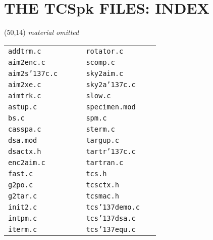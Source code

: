 \documentclass[12pt,fleqn,twoside]{article}
\renewcommand{\_}{{\tt\char'137}}     %
\newcommand{\abridged}  {\vspace{3ex} \begin{center}
                        \framebox(50,14){\vspace*{1mm}
                        \large \it material omitted}
                        \end{center}\vspace{3ex}}
\begin{document}
\ifx\vdoc\vfull
\vfill
\newpage
\fi
\section{THE TCSpk FILES: INDEX}

\ifx\vdoc\vshort
\abridged
\else

\vfill
\begin{center}
\begin{tabular}{lrclr}
{\tt addtrm.c    } & \pageref{tcsAddtrm}  & & {\tt rotator.c   } & \pageref{tcsRotator}  \\
{\tt aim2enc.c   } & \pageref{tcsAim2enc} & & {\tt scomp.c     } & \pageref{tptScomp}    \\
{\tt aim2s\_c.c  } & \pageref{tcsAim2s_c} & & {\tt sky2aim.c   } & \pageref{tcsSky2aim}  \\
{\tt aim2xe.c    } & \pageref{tcsAim2xe}  & & {\tt sky2a\_c.c  } & \pageref{tcsSky2a_c}  \\
{\tt aimtrk.c    } & \pageref{tcsAimtrk}  & & {\tt slow.c      } & \pageref{tcsSlow}     \\
{\tt astup.c     } & \pageref{tcsAstup}   & & {\tt specimen.mod} & \pageref{specimendotmod} \\
{\tt bs.c        } & \pageref{tcsBs}      & & {\tt spm.c       } & \pageref{tcsSpm}      \\
{\tt casspa.c    } & \pageref{tcsCasspa}  & & {\tt sterm.c     } & \pageref{tcsSterm}    \\
{\tt dsa.mod     } & \pageref{dsadotmod}  & & {\tt targup.c    } & \pageref{tcsTargup}   \\
{\tt dsactx.h    } & \pageref{dsactxdoth} & & {\tt tartr\_c.c  } & \pageref{tcsTartr_c}  \\
{\tt enc2aim.c   } & \pageref{tcsEnc2aim} & & {\tt tartran.c   } & \pageref{tcsTartran}  \\
{\tt fast.c      } & \pageref{tcsFast}    & & {\tt tcs.h       } & \pageref{tcsdoth}     \\
{\tt g2po.c      } & \pageref{tcsG2po}    & & {\tt tcsctx.h    } & \pageref{tcsctxdoth}  \\
{\tt g2tar.c     } & \pageref{tcsG2tar}   & & {\tt tcsmac.h    } & \pageref{tcsmacdoth}  \\
{\tt init2.c     } & \pageref{tcsInit2}   & & {\tt tcs\_demo.c } & \pageref{tcs_demo}    \\
{\tt intpm.c     } & \pageref{tcsIntpm}   & & {\tt tcs\_dsa.c  } & \pageref{tcs_dsa}     \\
{\tt iterm.c     } & \pageref{tcsIterm}   & & {\tt tcs\_equ.c  } & \pageref{tcs_equ}     \\

\end{tabular}
\end{center}
\end{document}
